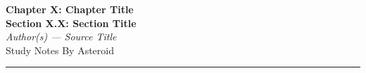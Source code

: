 \documentclass[11pt, a4paper]{article}
\begin{document}
\begin{center}
  {\LARGE \textbf{Chapter X: Chapter Title}} \\[4pt]
  {\LARGE \textbf{Section X.X: Section Title}} \\[6pt]
  {\large \textit{Author(s) --- Source Title}} \\[2pt]
  {\small Study Notes By Asteroid}
\end{center}


\vspace{0.5em}
\hrule
\vspace{1em}

\end{document}
